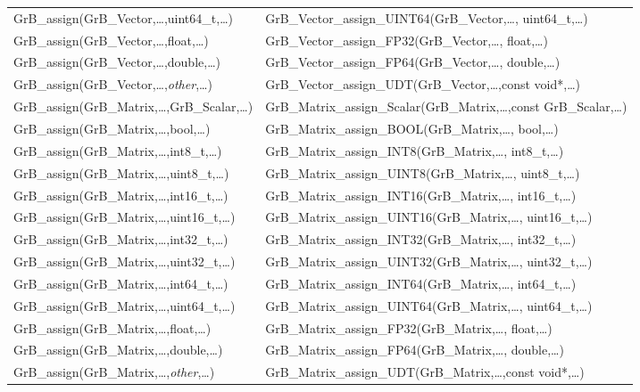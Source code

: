 \begin{table}[htb]
{\begin{tabular}{l|l}
{\sf GrB\_assign(GrB\_Vector,\ldots,uint64\_t,\ldots)}		& {\sf GrB\_Vector\_assign\_UINT64(GrB\_Vector,\ldots, uint64\_t,\ldots)} \\
{\sf GrB\_assign(GrB\_Vector,\ldots,float,\ldots)}		& {\sf GrB\_Vector\_assign\_FP32(GrB\_Vector,\ldots, float,\ldots)} \\
{\sf GrB\_assign(GrB\_Vector,\ldots,double,\ldots)}		& {\sf GrB\_Vector\_assign\_FP64(GrB\_Vector,\ldots, double,\ldots)} \\
{\sf GrB\_assign(GrB\_Vector,\ldots,\emph{other},\ldots)}	& {\sf GrB\_Vector\_assign\_UDT(GrB\_Vector,\ldots,const void*,\ldots)} \\ 
\hline

{\sf GrB\_assign(GrB\_Matrix,\ldots,GrB\_Scalar,\ldots)}	& {\sf GrB\_Matrix\_assign\_Scalar(GrB\_Matrix,\ldots,const GrB\_Scalar,\ldots)} \\
{\sf GrB\_assign(GrB\_Matrix,\ldots,bool,\ldots)}		& {\sf GrB\_Matrix\_assign\_BOOL(GrB\_Matrix,\ldots, bool,\ldots)} \\
{\sf GrB\_assign(GrB\_Matrix,\ldots,int8\_t,\ldots)}		& {\sf GrB\_Matrix\_assign\_INT8(GrB\_Matrix,\ldots, int8\_t,\ldots)} \\
{\sf GrB\_assign(GrB\_Matrix,\ldots,uint8\_t,\ldots)}		& {\sf GrB\_Matrix\_assign\_UINT8(GrB\_Matrix,\ldots, uint8\_t,\ldots)} \\
{\sf GrB\_assign(GrB\_Matrix,\ldots,int16\_t,\ldots)}		& {\sf GrB\_Matrix\_assign\_INT16(GrB\_Matrix,\ldots, int16\_t,\ldots)} \\
{\sf GrB\_assign(GrB\_Matrix,\ldots,uint16\_t,\ldots)}		& {\sf GrB\_Matrix\_assign\_UINT16(GrB\_Matrix,\ldots, uint16\_t,\ldots)} \\
{\sf GrB\_assign(GrB\_Matrix,\ldots,int32\_t,\ldots)}		& {\sf GrB\_Matrix\_assign\_INT32(GrB\_Matrix,\ldots, int32\_t,\ldots)} \\
{\sf GrB\_assign(GrB\_Matrix,\ldots,uint32\_t,\ldots)}		& {\sf GrB\_Matrix\_assign\_UINT32(GrB\_Matrix,\ldots, uint32\_t,\ldots)} \\
{\sf GrB\_assign(GrB\_Matrix,\ldots,int64\_t,\ldots)}		& {\sf GrB\_Matrix\_assign\_INT64(GrB\_Matrix,\ldots, int64\_t,\ldots)} \\
{\sf GrB\_assign(GrB\_Matrix,\ldots,uint64\_t,\ldots)}		& {\sf GrB\_Matrix\_assign\_UINT64(GrB\_Matrix,\ldots, uint64\_t,\ldots)} \\
{\sf GrB\_assign(GrB\_Matrix,\ldots,float,\ldots)}		& {\sf GrB\_Matrix\_assign\_FP32(GrB\_Matrix,\ldots, float,\ldots)} \\
{\sf GrB\_assign(GrB\_Matrix,\ldots,double,\ldots)}		& {\sf GrB\_Matrix\_assign\_FP64(GrB\_Matrix,\ldots, double,\ldots)} \\
{\sf GrB\_assign(GrB\_Matrix,\ldots,\emph{other},\ldots)}	& {\sf GrB\_Matrix\_assign\_UDT(GrB\_Matrix,\ldots,const void*,\ldots)} \\ 
\hline
\end{tabular}
}
\label{Tab:NonPolymorphic4a}
\end{table}

